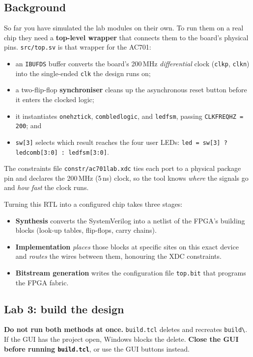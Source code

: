 \documentclass[11pt]{article}
\renewcommand{\_}{\textunderscore\allowbreak}
\let\origtextbackslash\textbackslash
\renewcommand{\textbackslash}{\origtextbackslash\allowbreak}
\begin{document}
\subsection{Background}
So far you have simulated the lab modules on their own. To run them on a real chip they need a
\textbf{top-level wrapper} that connects them to the board's physical pins. \texttt{src/top.sv} is that
wrapper for the AC701:
\begin{itemize}[noitemsep]
  \item an \texttt{IBUFDS} buffer converts the board's 200\,MHz \emph{differential} clock (\texttt{clk\_p},
        \texttt{clk\_n}) into the single-ended \texttt{clk} the design runs on;
  \item a two-flip-flop \textbf{synchroniser} cleans up the asynchronous reset button before it enters the
        clocked logic;
  \item it instantiates \texttt{one\_hz\_tick}, \texttt{comb\_led\_logic}, and \texttt{led\_fsm}, passing
        \texttt{CLK\_FREQ\_HZ = 200\_000\_000}; and
  \item \texttt{sw[3]} selects which result reaches the four user LEDs:
        \texttt{led = sw[3] ? led\_comb[3:0] : led\_fsm[3:0]}.
\end{itemize}
The constraints file \texttt{constr/ac701\_lab.xdc} ties each port to a physical package pin and declares the
200\,MHz (5\,ns) clock, so the tool knows \emph{where} the signals go and \emph{how fast} the clock runs.

Turning this RTL into a configured chip takes three stages:
\begin{itemize}[noitemsep]
  \item \textbf{Synthesis} converts the SystemVerilog into a netlist of the FPGA's building blocks
        (look-up tables, flip-flops, carry chains).
  \item \textbf{Implementation} \emph{places} those blocks at specific sites on this exact device and
        \emph{routes} the wires between them, honouring the XDC constraints.
  \item \textbf{Bitstream generation} writes the configuration file \texttt{top.bit} that programs the
        FPGA fabric.
\end{itemize}

\subsection{Lab 3: build the design}
\begin{notebox}
\textbf{Do not run both methods at once.} \texttt{build.tcl} deletes and recreates
\texttt{build\textbackslash}. If the GUI has the project open, Windows blocks the delete.
\textbf{Close the GUI before running \texttt{build.tcl}}, or use the GUI buttons instead.
\end{notebox}
\end{document}
